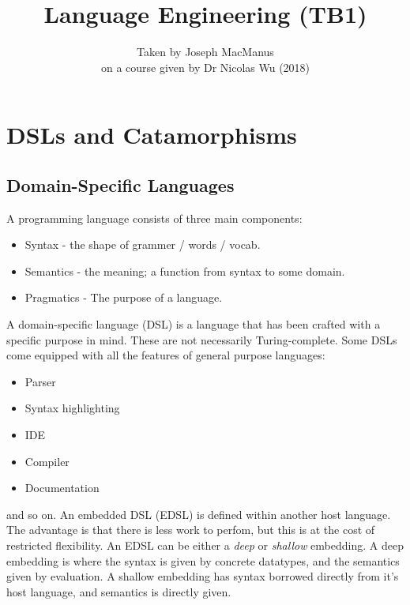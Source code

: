 \documentclass[a4paper,12pt]{article}
\theoremstyle{remark}
\begin{document}
	\title{Language Engineering (TB1)}
  \author{Taken by Joseph MacManus\\
          on a course given by Dr Nicolas Wu (2018)}
	\maketitle
	\tableofcontents
	\newpage

  \sloppy
  \setlength{\parindent}{0em}
  \setlength{\parskip}{1em}

  \section{DSLs and Catamorphisms}

  \subsection{Domain-Specific Languages}

  A programming language consists of three main components:
  \begin{itemize}
    \item Syntax - the shape of grammer / words / vocab.
    \item Semantics - the meaning; a function from syntax to some domain.
    \item Pragmatics - The purpose of a language.
  \end{itemize}

  A domain-specific language (DSL) is a language that has been crafted with a
  specific purpose in mind. These are not necessarily Turing-complete.
  Some DSLs come equipped with all the features of general purpose languages:
  \begin{itemize}
    \item Parser
    \item Syntax highlighting
    \item IDE
    \item Compiler
    \item Documentation
  \end{itemize}

  and so on. An embedded DSL (EDSL) is defined within another host language. The
  advantage is that there is less work to perfom, but this is at the cost of
  restricted flexibility. An EDSL can be either a \textit{deep} or \textit{shallow} embedding. A
  deep embedding is where the syntax is given by concrete datatypes, and the semantics given by
  evaluation. A shallow embedding has syntax borrowed directly from it's host language,
  and semantics is directly given.
\end{document}
